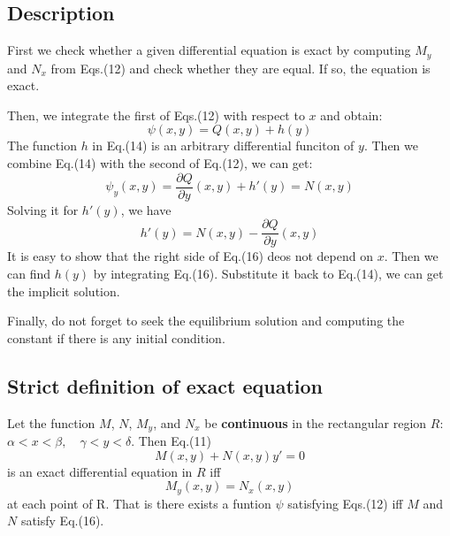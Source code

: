 \documentclass{article}
\begin{document}
\subsection{Description}
First we check whether a given differential equation is exact by computing $M_y$ and $N_x$ from Eqs.(12) and check whether they are equal. If so, the equation is exact. 

Then, we integrate the first of Eqs.(12) with respect to $x$ and obtain:
\begin{equation}
	\psi(x,y) = Q(x,y)+h(y)
\end{equation}
The function $h$ in Eq.(14) is an arbitrary differential funciton of $y$. Then we combine Eq.(14) with the second of Eq.(12), we can get:
\[\psi_y(x,y) = \frac{\partial Q}{\partial y}(x,y) + h'(y) = N(x,y) \]
Solving it for $h'(y)$, we have
\begin{equation}
	h'(y) = N(x,y) - \frac{\partial Q}{\partial y}(x,y)
\end{equation}
It is easy to show that the right side of Eq.(16) deos not depend on $x$. Then we can find $h(y)$ by integrating Eq.(16). Substitute it back to Eq.(14), we can get the implicit solution.

Finally, do not forget to seek the equilibrium solution and computing the constant if there is any initial condition.
\subsection{Strict definition of exact equation}
Let the function $M$, $N$, $M_y$, and $N_x$ be \textbf{continuous} in the rectangular region $R$:  $\alpha < x <\beta,\quad \gamma < y <\delta$. Then Eq.(11)\[M(x,y)+N(x,y)y' = 0\] is an exact differential equation in $R$ iff
\begin{equation}
	M_y(x,y) = N_x(x,y)
\end{equation}
at each point of R. That is there exists a funtion $\psi$ satisfying Eqs.(12) iff $M$ and $N$ satisfy Eq.(16).
\end{document}

